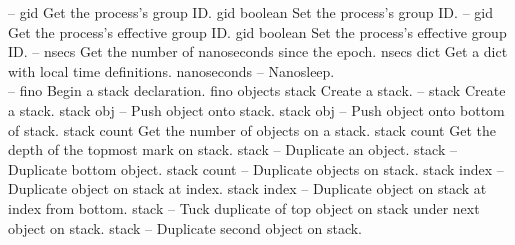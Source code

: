 \begin{longtable}{}
\hline
\optableent
	{--}
	{{\bf {}}}
	{gid}
	{Get the process's group ID.}
\hline
\optableent
	{gid}
	{{\bf {}}}
	{boolean}
	{Set the process's group ID.}
\hline
\optableent
	{--}
	{{\bf {}}}
	{gid}
	{Get the process's effective group ID.}
\hline
\optableent
	{gid}
	{{\bf {}}}
	{boolean}
	{Set the process's effective group ID.}
\hline
\optableent
	{--}
	{{\bf {}}}
	{nsecs}
	{Get the number of nanoseconds since the epoch.}
\hline
\optableent
	{nsecs}
	{{\bf {}}}
	{dict}
	{Get a dict with local time definitions.}
\hline
\optableent
	{nanoseconds}
	{{\bf {}}}
	{--}
	{Nanosleep.}
\hline \hline
{} \\
\hline \hline
\optableent
	{--}
	{{\bf {}}}
	{fino}
	{Begin a stack declaration.}
\hline
\optableent
	{fino objects}
	{{\bf {}}}
	{stack}
	{Create a stack.}
\hline
\optableent
	{--}
	{{\bf {}}}
	{stack}
	{Create a stack.}
\hline
\optableent
	{stack obj}
	{{\bf {}}}
	{--}
	{Push object onto stack.}
\hline
\optableent
	{stack obj}
	{{\bf {}}}
	{--}
	{Push object onto bottom of stack.}
\hline
\optableent
	{stack}
	{{\bf {}}}
	{count}
	{Get the number of objects on a stack.}
\hline
\optableent
	{stack}
	{{\bf {}}}
	{count}
	{Get the depth of the topmost mark on stack.}
\hline
\optableent
	{stack}
	{{\bf {}}}
	{--}
	{Duplicate an object.}
\hline
\optableent
	{stack}
	{{\bf {}}}
	{--}
	{Duplicate bottom object.}
\hline
\optableent
	{stack count}
	{{\bf {}}}
	{--}
	{Duplicate objects on stack.}
\hline
\optableent
	{stack index}
	{{\bf {}}}
	{--}
	{Duplicate object on stack at index.}
\hline
\optableent
	{stack index}
	{{\bf {}}}
	{--}
	{Duplicate object on stack at index from bottom.}
\hline
\optableent
	{stack}
	{{\bf {}}}
	{--}
	{Tuck duplicate of top object on stack under next object on stack.}
\hline
\optableent
	{stack}
	{{\bf {}}}
	{--}
	{Duplicate second object on stack.}
\hline
\optableent

\end{longtable}
